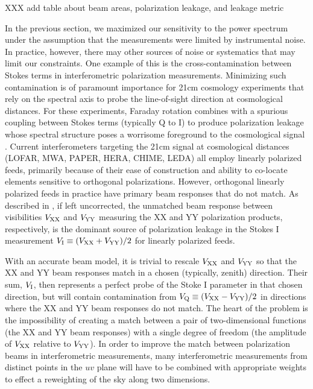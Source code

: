 \documentclass[twocolumn,apj,numberedappendix]{emulateapj}
\begin{document}
XXX add table about beam areas, polarization leakage, and leakage metric

In the previous section, we maximized our sensitivity to the power spectrum under the assumption that the measurements were limited by instrumental noise. In practice, however, there may other sources of noise or systematics that may limit our constraints. One example of this is the cross-contamination between Stokes terms in interferometric polarization measurements. Minimizing such contamination is of paramount importance for 21cm cosmology experiments that rely on
the spectral axis to probe the line-of-sight direction at cosmological distances.  For these
experiments, Faraday rotation combines
with a spurious coupling between Stokes terms (typically Q to I) to produce polarization leakage whose 
spectral structure poses a worrisome foreground
to the cosmological signal \citep{jelic_et_al2008,moore_et_al2013,moore_et_al2015}.  Current interferometers
targeting the 21cm signal at cosmological distances (LOFAR, MWA, PAPER, HERA, CHIME, LEDA) all employ linearly
polarized feeds, primarily because of their ease of construction and ability to co-locate elements sensitive to
orthogonal polarizations.  However, orthogonal linearly polarized feeds in practice have primary beam responses
that do not match.  As described in \citet{moore_et_al2013}, if left uncorrected, the unmatched beam response 
between visibilities ${V_{\rm XX}}$ and ${V_{\rm YY}}$ measuring the XX and YY polarization products, respectively, is the 
dominant source of polarization leakage in the Stokes I measurement ${V_{\rm I}}\equiv({V_{\rm XX}}+{V_{\rm YY}})/2$ for
linearly polarized feeds.

With an accurate beam model, it is trivial to rescale ${V_{\rm XX}}$ and ${V_{\rm YY}}$ 
so that the XX and YY beam responses match in a chosen (typically, zenith) direction.  Their sum, ${V_{\rm I}}$, then
represents a perfect probe of the Stoke I parameter in that chosen direction, but will contain contamination
from ${V_{\rm Q}}\equiv({V_{\rm XX}}-{V_{\rm YY}})/2$ in directions where the XX and YY beam responses do not match.
The heart of the problem is the impossibility of creating a match between a pair of two-dimensional functions (the
XX and YY beam responses) with a single degree of freedom (the amplitude of ${V_{\rm XX}}$ relative to ${V_{\rm YY}}$).  In order
to improve the match between polarization beams in interferometric measurements, many interferometric measurements
from distinct points in the $uv$ plane will have to be combined with appropriate weights to effect a reweighting
of the sky along two dimensions.
\end{document}
